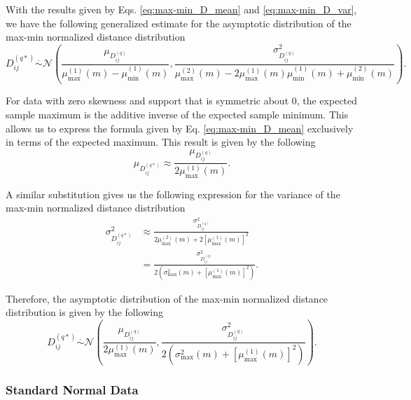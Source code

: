 \documentclass[10pt,letterpaper]{article}\usepackage[]{graphicx}\usepackage[]{color}
\begin{document}
With the results given by Eqs. \ref{eq:max-min_D_mean} and \ref{eq:max-min_D_var}, we have the following generalized estimate for the asymptotic distribution of the max-min normalized distance distribution
%
\begin{equation}\label{eq:max-min-DDistr-general}
D^{(q*)}_{ij} \overset{.}{\sim} \mathcal{N}\left(\frac{\mu_{D^{(q)}_{ij}}}{\mu^{(1)}_\text{max}(m) - \mu^{(1)}_\text{min}(m)}, \frac{\sigma^2_{D^{(q)}_{ij}}}{\mu^{(2)}_\text{max}(m) - 2 \mu^{(1)}_\text{max}(m) \mu^{(1)}_\text{min}(m) + \mu^{(2)}_\text{min}(m)}\right).
\end{equation}

For data with zero skewness and support that is symmetric about 0, the expected sample maximum is the additive inverse of the expected sample minimum. This allows us to express the formula given by Eq. \ref{eq:max-min_D_mean} exclusively in terms of the expected maximum. This result is given by the following
%
\begin{equation}\label{eq:max-min_D_mean_symm}
\mu_{D^{(q*)}_{ij}} \approx \frac{\mu_{D^{(q)}_{ij}}}{2\mu^{(1)}_\text{max}(m)}.
\end{equation}

A similar substitution gives us the following expression for the variance of the max-min normalized distance distribution
%
\begin{equation}\label{eq:max-min_D_var_symm}
\begin{aligned}
\sigma^2_{D^{(q*)}_{ij}} &\approx \frac{\sigma^2_{D^{(q)}_{ij}}}{2\mu^{(2)}_\text{max}(m) + 2\left[\mu^{(1)}_\text{max}(m)\right]^2} \\
&= \frac{\sigma^2_{D^{(q)}_{ij}}}{2\left(\sigma^2_\text{max}(m) + \left[\mu^{(1)}_\text{max}(m)\right]^2\right)}.
\end{aligned}
\end{equation}

Therefore, the asymptotic distribution of the max-min normalized distance distribution is given by the following
%
\begin{equation}\label{eq:max-min_DDistr}
D^{(q*)}_{ij} \overset{.}{\sim} \mathcal{N}\left(\frac{\mu_{D^{(q)}_{ij}}}{2\mu^{(1)}_\text{max}(m)}, \frac{\sigma^2_{D^{(q)}_{ij}}}{2\left(\sigma^2_\text{max}(m) + \left[\mu^{(1)}_\text{max}(m)\right]^2\right)}\right).
\end{equation}

\subsubsection{Standard Normal Data}
\end{document}
